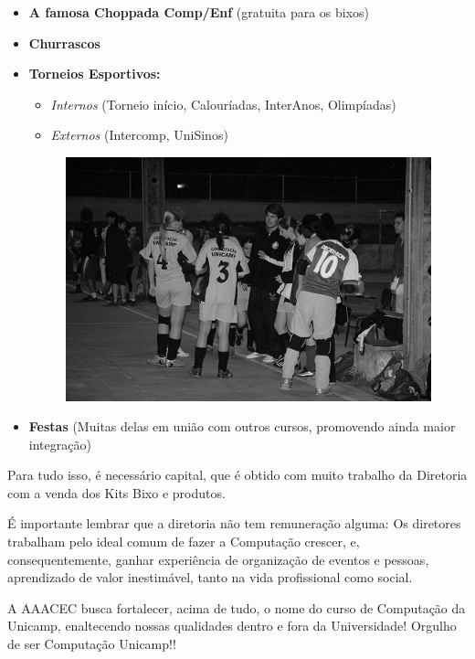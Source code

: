 \begin{itemize}
\item  \textbf{A famosa Choppada Comp/Enf} (gratuita para os bixos)
\item  \textbf{Churrascos}
\item  \textbf{Torneios Esportivos:}
\begin{itemize}
\item  \textit{Internos} (Torneio início, Calouríadas, InterAnos, Olimpíadas)
\item  \textit{Externos} (Intercomp, UniSinos)
\end{itemize}
\begin{figure}[h!]
    \vspace{-10pt}
    \centering
    \includegraphics[scale=0.58, keepaspectratio=true]{img/imgs/20-aaacec/-100.jpg}
    \vspace{-10pt}
\end{figure}
\item  \textbf{Festas} (Muitas delas em união com outros cursos, promovendo ainda maior integração)
\end{itemize}

Para tudo isso, é necessário capital, que é obtido com muito trabalho da
Diretoria com a venda dos Kits Bixo e produtos.

É importante lembrar que a diretoria não tem remuneração alguma: Os diretores
trabalham pelo ideal comum de fazer a Computação crescer, e, consequentemente,
ganhar experiência de organização de eventos e pessoas, aprendizado de valor
inestimável, tanto na vida profissional como social.

A AAACEC busca fortalecer, acima de tudo, o nome do curso de Computação da
Unicamp, enaltecendo nossas qualidades dentro e fora da Universidade! Orgulho de
ser Computação Unicamp!!

